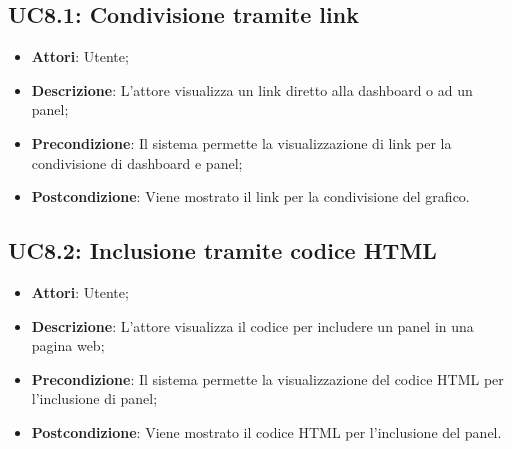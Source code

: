 \subsection{UC8.1: Condivisione tramite link}
\begin{itemize}
	\item \textbf{Attori}: Utente;
	\item \textbf{Descrizione}: L'attore visualizza un link diretto alla dashboard o ad un panel;
	\item \textbf{Precondizione}: Il sistema permette la visualizzazione di link per la condivisione di dashboard e panel;
	\item \textbf{Postcondizione}: Viene mostrato il link per la condivisione del grafico.
\end{itemize}

\subsection{UC8.2: Inclusione tramite codice HTML}
\begin{itemize}
	\item \textbf{Attori}: Utente;
	\item \textbf{Descrizione}: L'attore visualizza il codice  per includere un panel in una pagina web;
	\item \textbf{Precondizione}: Il sistema permette la visualizzazione del codice HTML per l'inclusione di panel;
	\item \textbf{Postcondizione}: Viene mostrato il codice HTML per l'inclusione del panel.
\end{itemize}


